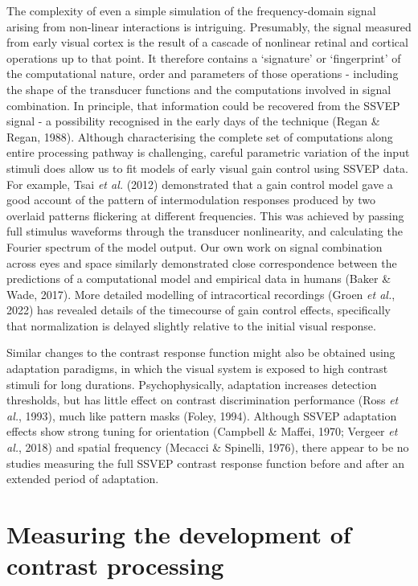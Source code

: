 \documentclass[
  letterpaper,
  DIV=11,
  numbers=noendperiod]{scrartcl}
\begin{document}
The complexity of even a simple simulation of the frequency-domain
signal arising from non-linear interactions is intriguing. Presumably,
the signal measured from early visual cortex is the result of a cascade
of nonlinear retinal and cortical operations up to that point. It
therefore contains a `signature' or `fingerprint' of the computational
nature, order and parameters of those operations - including the shape
of the transducer functions and the computations involved in signal
combination. In principle, that information could be recovered from the
SSVEP signal - a possibility recognised in the early days of the
technique (Regan \& Regan, 1988). Although characterising the complete
set of computations along entire processing pathway is challenging,
careful parametric variation of the input stimuli does allow us to fit
models of early visual gain control using SSVEP data. For example, Tsai
\emph{et al.} (2012) demonstrated that a gain control model gave a good
account of the pattern of intermodulation responses produced by two
overlaid patterns flickering at different frequencies. This was achieved
by passing full stimulus waveforms through the transducer nonlinearity,
and calculating the Fourier spectrum of the model output. Our own work
on signal combination across eyes and space similarly demonstrated close
correspondence between the predictions of a computational model and
empirical data in humans (Baker \& Wade, 2017). More detailed modelling
of intracortical recordings (Groen \emph{et al.}, 2022) has revealed
details of the timecourse of gain control effects, specifically that
normalization is delayed slightly relative to the initial visual
response.

Similar changes to the contrast response function might also be obtained
using adaptation paradigms, in which the visual system is exposed to
high contrast stimuli for long durations. Psychophysically, adaptation
increases detection thresholds, but has little effect on contrast
discrimination performance (Ross \emph{et al.}, 1993), much like pattern
masks (Foley, 1994). Although SSVEP adaptation effects show strong
tuning for orientation (Campbell \& Maffei, 1970; Vergeer \emph{et al.},
2018) and spatial frequency (Mecacci \& Spinelli, 1976), there appear to
be no studies measuring the full SSVEP contrast response function before
and after an extended period of adaptation.

\section{Measuring the development of contrast
processing}\label{measuring-the-development-of-contrast-processing}
\end{document}
